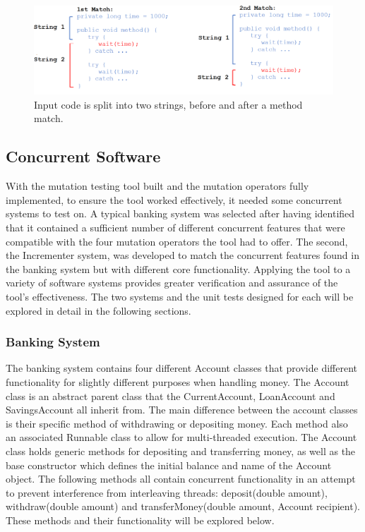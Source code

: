 \documentclass[a4paper,12pt]{article}
\begin{document}
\begin{figure}[h]
    \hspace{-1.6cm}
    \includegraphics[scale =0.4]{random_match.png}
    \caption{Input code is split into two strings, before and after a method match.}
    \label{fig:rand_match}
\end{figure}


\subsection{Concurrent Software}

With the mutation testing tool built and the mutation operators fully implemented, to ensure the tool worked effectively, it needed some concurrent systems to test on. A typical banking system was selected after having identified that it contained a sufficient number of different concurrent features that were compatible with the four mutation operators the tool had to offer. The second, the Incrementer system, was developed to match the concurrent features found in the banking system but with different core functionality. Applying the tool to a variety of software systems provides greater verification and assurance of the tool's effectiveness. The two systems and the unit tests designed for each will be explored in detail in the following sections.


\subsubsection{Banking System}

The banking system contains four different Account classes that provide different functionality for slightly different purposes when handling money. The Account class is an abstract parent class that the CurrentAccount, LoanAccount and SavingsAccount all inherit from. The main difference between the account classes is their specific method of withdrawing or depositing money. Each method also an associated Runnable class to allow for multi-threaded execution. The Account class holds generic methods for depositing and transferring money, as well as the base constructor which defines the initial balance and name of the Account object. The following methods all contain concurrent functionality in an attempt to prevent interference from interleaving threads:  deposit(double amount), withdraw(double amount) and transferMoney(double amount, Account recipient). These methods and their functionality will be explored below. 
\end{document}
